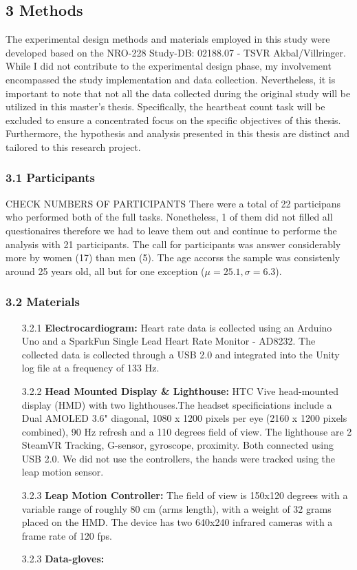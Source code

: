 \documentclass[12pt,oneside,openright]{report}
\begin{document}
\subsection*{3 Methods}
The experimental design methods and materials employed in this study were developed based on the NRO-228 Study-DB: 02188.07 - TSVR Akbal/Villringer. While I did not contribute to the experimental design phase, my involvement encompassed the study implementation and data collection. Nevertheless, it is important to note that not all the data collected during the original study will be utilized in this master's thesis. Specifically, the heartbeat count task will be excluded to ensure a concentrated focus on the specific objectives of this thesis. Furthermore, the hypothesis and analysis presented in this thesis are distinct and tailored to this research project.

\subsubsection*{3.1 Participants}
CHECK NUMBERS OF PARTICIPANTS There were a total of 22 participans who performed both of the full tasks. Nonetheless, 1 of them did not filled all questionaires therefore we had to leave them out and continue to performe the analysis with 21 participants. The call for participants was answer considerably more by women (17) than men (5). The age accorss the sample was consistenly around 25 years old, all but for one exception ($\mu=25.1 , \sigma=6.3$).

\subsubsection*{3.2 Materials}
  \begin{enumerate}
    \item[3.2.1] \textbf{Electrocardiogram:} Heart rate data is collected using an Arduino Uno and a SparkFun Single Lead Heart Rate Monitor - AD8232. The collected data is collected through a USB 2.0 and integrated into the Unity log file at a frequency of 133 Hz.
    \item[3.2.2] \textbf{Head Mounted Display \& Lighthouse:} HTC Vive head-mounted display (HMD) with  two lighthouses.The headset specificiations include a Dual AMOLED 3.6" diagonal, 	1080 x 1200 pixels per eye (2160 x 1200 pixels combined), 90 Hz refresh and a 110 degrees field of view.  The lighthouse are 2 SteamVR Tracking, G-sensor, gyroscope, proximity. Both connected using  USB 2.0. We did not use the controllers, the hands were tracked using the leap motion sensor. 
    \item[3.2.3] \textbf{Leap Motion Controller:}  The field of view is 150x120 degrees with a variable range of roughly 80 cm (arms length), with a weight of 32 grams placed on the HMD. The device has two 640x240 infrared cameras with a frame rate of 120 fps. 
    \item[3.2.3] \textbf{Data-gloves:} 
  \end{enumerate}
\end{document}
